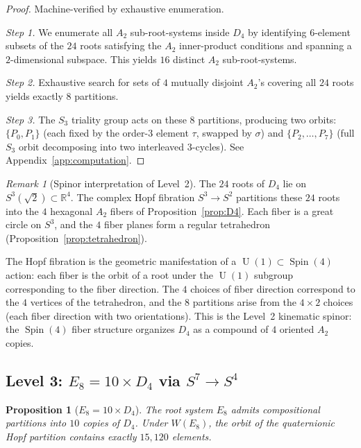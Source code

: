 \documentclass[11pt,reqno]{amsart}
\theoremstyle{plain}
\newtheorem{proposition}[theorem]{Proposition}
\theoremstyle{definition}
\theoremstyle{remark}
\newtheorem{remark}[theorem]{Remark}
\newcommand{\R}{\mathbb{R}}
\DeclareMathOperator{\Spin}{Spin}
\DeclareMathOperator{\U}{U}
\begin{document}
\begin{proof}
Machine-verified by exhaustive enumeration.

\emph{Step 1.}
We enumerate all $A_2$ sub-root-systems inside $D_4$
by identifying $6$-element subsets of the $24$ roots
satisfying the $A_2$ inner-product conditions and
spanning a $2$-dimensional subspace.
This yields $16$ distinct $A_2$ sub-root-systems.

\emph{Step 2.}
Exhaustive search for sets of $4$ mutually disjoint $A_2$'s
covering all $24$ roots yields exactly $8$ partitions.

\emph{Step 3.}
The $S_3$ triality group acts on these $8$ partitions,
producing two orbits: $\{P_0, P_1\}$ (each fixed by the
order-$3$ element $\tau$, swapped by $\sigma$) and
$\{P_2,\ldots,P_7\}$ (full $S_3$ orbit decomposing into
two interleaved $3$-cycles).
See Appendix~\ref{app:computation}.
\end{proof}

\begin{remark}[Spinor interpretation of Level~2]
\label{rem:spinorlevel2}
The $24$ roots of $D_4$ lie on $S^3(\sqrt{2}) \subset \R^4$.
The complex Hopf fibration $S^3 \to S^2$ partitions these
$24$ roots into the $4$ hexagonal $A_2$ fibers of
Proposition~\ref{prop:D4}.
Each fiber is a great circle on $S^3$, and the
$4$ fiber planes form a regular tetrahedron
(Proposition~\ref{prop:tetrahedron}).

The Hopf fibration is the geometric manifestation of a
$\U(1) \subset \Spin(4)$ action: each fiber is the orbit
of a root under the $\U(1)$ subgroup corresponding to
the fiber direction.
The $4$ choices of fiber direction correspond to the $4$
vertices of the tetrahedron, and the $8$ partitions arise
from the $4 \times 2$ choices (each fiber direction with
two orientations).
This is the Level~2 kinematic spinor:
the $\Spin(4)$ fiber structure organizes $D_4$ as a compound
of $4$ oriented $A_2$ copies.
\end{remark}

\subsection{Level 3: $E_8 = 10 \times D_4$ via $S^7 \to S^4$}

\begin{proposition}[$E_8 = 10 \times D_4$]\label{prop:E8}
The root system $E_8$ admits compositional partitions into $10$
copies of $D_4$.
Under $W(E_8)$, the orbit of the quaternionic Hopf partition
contains exactly $15{,}120$ elements.
\end{proposition}
\end{document}
